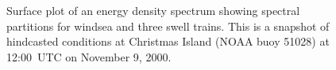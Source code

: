 \begin{figure} \begin{center}
\caption{Surface plot of an energy density spectrum showing spectral
         partitions for windsea and three swell trains.  This is a snapshot of
         hindcasted conditions at Christmas Island (NOAA buoy 51028) at
         12:00~UTC on November 9, 2000.}
         \label{fig:partitions} \botline
\end{center}
\end{figure}





